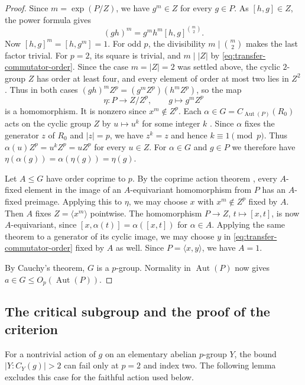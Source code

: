 \documentclass[11pt,a4paper]{article}
\theoremstyle{definition}
\theoremstyle{remark}
\numberwithin{equation}{section}
\DeclareMathOperator{\Aut}{Aut}
\begin{document}
\begin{proof}
		Since $m=\exp(P/Z)$, we have $g^m\in Z$ for every $g\in P$.
		As $[h,g]\in Z$, the power formula
		\cite[Lemma~3.3]{BlackburnNeumannVenkataraman2007} gives
		\[
		(gh)^m=g^mh^m[h,g]^{\binom{m}{2}}.
		\]
		Now $[h,g]^m=[h,g^m]=1$. For odd $p$, the divisibility
		$m\mid\binom{m}{2}$ makes the last factor trivial. For $p=2$, its square
		is trivial, and $m\mid |Z|$ by \eqref{eq:transfer-commutator-order}.
		Since the case $m=|Z|=2$ was settled above, the cyclic $2$-group $Z$
		has order at least four, and every element of order at most two lies in $Z^2$.
		Thus in both cases $(gh)^mZ^p=(g^mZ^p)(h^mZ^p)$, so the map
		\[
		\eta:P\longrightarrow Z/Z^p,\qquad g\longmapsto g^mZ^p
		\]
		is a homomorphism. It is nonzero since $x^m\notin Z^p$.
		Each $\alpha\in G=C_{\Aut(P)}(R_0)$ acts on the cyclic group $Z$ by
		$u\mapsto u^k$ for some integer $k$ \cite[2.2.2]{KurzweilStellmacher2004}.
		Since $\alpha$ fixes the generator $z$ of $R_0$ and $|z|=p$,
		we have $z^k=z$ and hence $k\equiv1\pmod p$. Thus
		$\alpha(u)Z^p=u^kZ^p=uZ^p$ for every $u\in Z$.
		For $\alpha\in G$ and $g\in P$ we therefore have
		$\eta(\alpha(g))=\alpha(\eta(g))=\eta(g)$.
		
		Let $A\le G$ have order coprime to $p$. By the coprime action theorem
		\cite[Theorem~6.2]{Craven2008}, every $A$-fixed element in the image of an
		$A$-equivariant homomorphism from $P$ has an $A$-fixed preimage.
		Applying this to $\eta$, we may choose $x$ with $x^m\notin Z^p$ fixed by $A$.
		Then $A$ fixes $Z=\langle x^m\rangle$ pointwise. The homomorphism
		$P\to Z$, $t\mapsto[x,t]$, is now $A$-equivariant, since
		$[x,\alpha(t)]=\alpha([x,t])$ for $\alpha\in A$. Applying the same theorem
		to a generator of its cyclic image, we may choose $y$ in
		\eqref{eq:transfer-commutator-order} fixed by $A$ as well.
		Since $P=\langle x,y\rangle$, we have $A=1$.
		
		By Cauchy's theorem, $G$ is a $p$-group. Normality in $\Aut(P)$ now gives
		$a\in G\le O_p(\Aut(P))$.
	\end{proof}
	
	\subsection{The critical subgroup and the proof of the criterion}
	
	For a nontrivial action of $g$ on an elementary abelian $p$-group $Y$,
	the bound $|Y:C_Y(g)|>2$ can fail only at $p=2$ and index two.
	The following lemma excludes this case for the faithful action used below.
	
\end{document}
